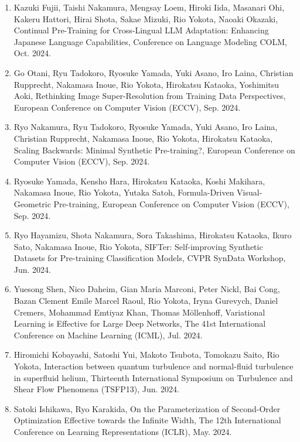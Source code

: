 \documentclass[margin,line]{cv}
\begin{document}
\begin{resume}
\begin{enumerate}
\item Kazuki Fujii, Taishi Nakamura, Mengsay Loem, Hiroki Iida, Masanari Ohi, Kakeru Hattori, Hirai Shota, Sakae Mizuki, Rio Yokota, Naoaki Okazaki, Continual Pre-Training for Cross-Lingual LLM Adaptation: Enhancing Japanese Language Capabilities, Conference on Language Modeling COLM, Oct. 2024.

\item Go Otani, Ryu Tadokoro, Ryosuke Yamada, Yuki Asano, Iro Laina, Christian Rupprecht, Nakamasa Inoue, Rio Yokota, Hirokatsu Kataoka, Yoshimitsu Aoki, Rethinking Image Super-Resolution from Training Data Perspectives, European Conference on Computer Vision (ECCV), Sep. 2024.

\item Ryo Nakamura, Ryu Tadokoro, Ryosuke Yamada, Yuki Asano, Iro Laina, Christian Rupprecht, Nakamasa Inoue, Rio Yokota, Hirokatsu Kataoka, Scaling Backwards: Minimal Synthetic Pre-training?, European Conference on Computer Vision (ECCV), Sep. 2024.

\item Ryosuke Yamada, Kensho Hara, Hirokatsu Kataoka, Koshi Makihara, Nakamasa Inoue, Rio Yokota, Yutaka Satoh, Formula-Driven Visual-Geometric Pre-training, European Conference on Computer Vision (ECCV), Sep. 2024.

\item Ryo Hayamizu, Shota Nakamura, Sora Takashima, Hirokatsu Kataoka, Ikuro Sato, Nakamasa Inoue, Rio Yokota, SIFTer: Self-improving Synthetic Datasets for Pre-training Classification Models, CVPR SynData Workshop, Jun. 2024.

\item Yuesong Shen, Nico Daheim, Gian Maria Marconi, Peter Nickl, Bai Cong, Bazan Clement Emile Marcel Raoul, Rio Yokota, Iryna Gurevych, Daniel Cremers, Mohammad Emtiyaz Khan, Thomas M\"{o}llenhoff, Variational Learning is Effective for Large Deep Networks, The 41st International Conference on Machine Learning (ICML), Jul. 2024.

\item Hiromichi Kobayashi, Satoshi Yui, Makoto Tsubota, Tomokazu Saito, Rio Yokota, Interaction between quantum turbulence and normal-fluid turbulence in superfluid helium, Thirteenth International Symposium on Turbulence and Shear Flow Phenomena (TSFP13), Jun. 2024.

\item Satoki Ishikawa, Ryo Karakida, On the Parameterization of Second-Order Optimization Effective towards the Infinite Width, The 12th International Conference on Learning Representations (ICLR), May. 2024.


\end{enumerate}
\end{resume}
\end{document}

